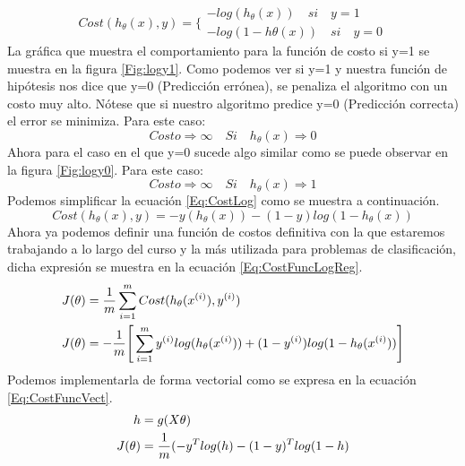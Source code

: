 \documentclass{report}
\begin{document}
\begin{equation}
Cost(h_\theta(x),y)=\Big\{
	\begin{array}{c}
	-log(h_\theta(x))\quad si\quad y=1
	\\-log(1-h\theta(x))\quad si\quad y=0
	\end{array}
	\label{Eq:CostLog}
\end{equation}
La gráfica que muestra el comportamiento para la función de costo si y=1 se muestra en la figura \ref{Fig:logy1}. Como podemos ver si y=1 y nuestra función de hipótesis nos dice que y=0 (Predicción errónea), se penaliza el algoritmo con un costo muy alto. Nótese que si nuestro algoritmo predice y=0 (Predicción correcta) el error se minimiza. Para este caso:\[
Costo \Rightarrow \infty\quad Si\quad h_\theta(x)\Rightarrow0
\]
Ahora para el caso en el que y=0 sucede algo similar como se puede observar en la figura \ref{Fig:logy0}. 
Para este caso:\[
Costo \Rightarrow \infty\quad Si\quad h_\theta(x)\Rightarrow1
\]
Podemos simplificar la ecuación \ref{Eq:CostLog} como se muestra a continuación.
\begin{equation}
	Cost(h_\theta(x),y)=-y(h_\theta(x))-(1-y)log(1-h_\theta(x))
	\label{Eq:CostClas}
\end{equation}
Ahora ya podemos definir una función de costos definitiva con la que estaremos trabajando a lo largo del curso y la más utilizada para problemas de clasificación, dicha expresión se muestra en la ecuación \ref{Eq:CostFuncLogReg}.
\begin{align}
	J(\theta)&=\frac{1}{m}\sum_{i=1}^{m}Cost(h_\theta(x^{(i)}),y^{(i)})\notag\\
	J(\theta)&=-\frac{1}{m}\Bigg[\sum_{i=1}^{m}y^{(i)}log(h_\theta(x^{(i)}))+(1-y^{(i)})log(1-h_\theta(x^{(i)}))\Bigg]\label{Eq:CostFuncLogReg}
\end{align}
Podemos implementarla de forma vectorial como se expresa en la ecuación \ref{Eq:CostFuncVect}.
\begin{align}
h&=g(X\theta)\\\notag
J(\theta)&=\frac{1}{m}(-y^Tlog(h)-(1-y)^Tlog(1-h)\label{Eq:CostFuncVect}
\end{align}
\end{document}
